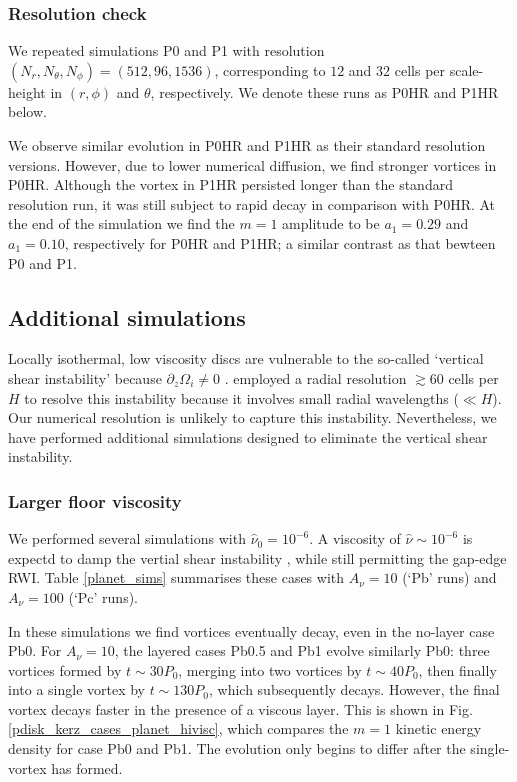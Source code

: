 \subsubsection{Resolution check}%
We repeated simulations P0 and P1 with resolution
$(N_r,N_\theta,N_\phi)=(512,96,1536)$, corresponding
to $12$ and $32$ cells per scale-height in $(r,\phi)$ and $\theta$,
respectively. We denote these runs as P0HR and P1HR below. 

We observe similar evolution in P0HR and P1HR as their standard
resolution versions. However, due to lower numerical diffusion, we
find stronger vortices in P0HR. Although the vortex in P1HR persisted
longer than the standard resolution run, it was still subject to rapid
decay in comparison with P0HR. At the end of the simulation we find
the $m=1$ amplitude to be $a_1=0.29$ and $a_1=0.10$, respectively for
P0HR and P1HR; a similar contrast as that bewteen P0 and P1.    


\subsection{Additional simulations}%
Locally isothermal, low viscosity discs are vulnerable to the
so-called `vertical shear 
instability' because $\partial_z\Omega_i\neq 0$ \citep{nelson12}. 
\citeauthor{nelson12} employed a radial  resolution $\gtrsim 60$ cells
per $H$ to resolve this instability because it involves small radial
wavelengths ($\ll H$). Our numerical resolution is unlikely to capture
this instability. Nevertheless, we have performed additional
simulations designed to eliminate the vertical shear instability.   

\subsubsection{Larger floor viscosity}
We performed several simulations with $\hat{\nu}_0=10^{-6}$. A viscosity of
$\hat{\nu}\sim 10^{-6}$ is expectd to damp the vertial shear 
instability \citep{nelson12}, while still permitting the gap-edge
RWI. Table \ref{planet_sims} summarises
these cases with $A_\nu=10$ (`Pb' runs) and $A_\nu=100$ (`Pc' runs). 

In these simulations we find vortices eventually decay, even in the
no-layer case Pb0. For $A_\nu=10$, the layered cases Pb0.5 and Pb1 evolve
similarly Pb0: three vortices formed by $t\sim30P_0$, merging into two
vortices by $t\sim40P_0$, then finally into a single vortex by
$t\sim130P_0$, which subsequently decays. However, the final vortex
decays faster in the presence of a viscous layer. This is shown in
Fig. \ref{pdisk_kerz_cases_planet_hivisc}, which compares the $m=1$
kinetic energy density for case Pb0 and Pb1. The evolution only begins
to differ after the single-vortex has formed. 

